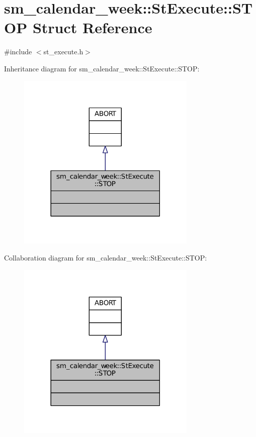 \hypertarget{structsm__calendar__week_1_1StExecute_1_1STOP}{}\section{sm\+\_\+calendar\+\_\+week\+:\+:St\+Execute\+:\+:S\+T\+OP Struct Reference}
\label{structsm__calendar__week_1_1StExecute_1_1STOP}


{\ttfamily \#include $<$st\+\_\+execute.\+h$>$}



Inheritance diagram for sm\+\_\+calendar\+\_\+week\+:\+:St\+Execute\+:\+:S\+T\+OP\+:
\nopagebreak
\begin{figure}[H]
\begin{center}
\leavevmode
\includegraphics[width=242pt]{structsm__calendar__week_1_1StExecute_1_1STOP__inherit__graph}
\end{center}
\end{figure}


Collaboration diagram for sm\+\_\+calendar\+\_\+week\+:\+:St\+Execute\+:\+:S\+T\+OP\+:
\nopagebreak
\begin{figure}[H]
\begin{center}
\leavevmode
\includegraphics[width=242pt]{structsm__calendar__week_1_1StExecute_1_1STOP__coll__graph}
\end{center}
\end{figure}


